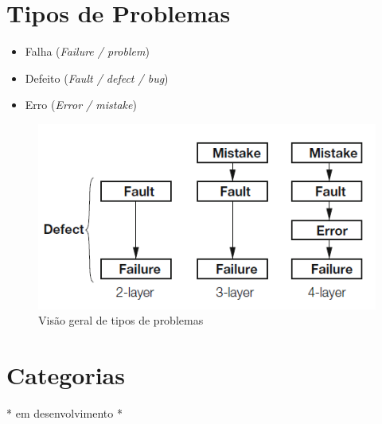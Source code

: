 \documentclass[
	12pt,				%
	openright,			%
	oneside,			%
	a4paper,			%
	english,			%
	brazil,				%
	]{abntex2}
\begin{document}



\section{Tipos de Problemas}


\begin{itemize}
    \item Falha (\emph{Failure / problem})
    \item Defeito (\emph{Fault / defect / bug})
    \item Erro (\emph{Error / mistake})
\end{itemize}

\begin{figure}[h]
    \centering
    \graphicspath{ {./graphics/} }
    \includegraphics[scale=0.8]{defeito_falha_erro}
    \caption{Visão geral de tipos de problemas}
    \label{fig:tipos_problemas}
\end{figure}

\section{Categorias}
* em desenvolvimento *
\end{document}
